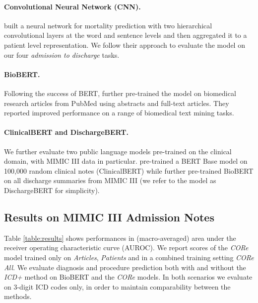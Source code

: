 \documentclass[11pt,a4paper]{article}
\begin{document}
\paragraph{Convolutional Neural Network (CNN).}
\citet{multitask-mortality} built a neural network for mortality prediction with two hierarchical convolutional layers at the word and sentence levels and then aggregated it to a patient level representation. We follow their approach to evaluate the model on our four \textit{admission to discharge} tasks.

\paragraph{BioBERT.}
Following the success of BERT, \citet{biobert} further pre-trained the model on biomedical research articles from PubMed using abstracts and full-text articles. They reported improved performance on a range of biomedical text mining tasks.

\paragraph{ClinicalBERT and DischargeBERT.} We further evaluate two public language models pre-trained on the clinical domain, with MIMIC III data in particular. \citet{huang-clinical-bert} pre-trained a BERT Base model on 100,000 random clinical notes (ClinicalBERT) while \citet{alsentzer-clinical-bert} further pre-trained BioBERT on all discharge summaries from MIMIC III (we refer to the model as DischargeBERT for simplicity).

\subsection{Results on MIMIC III Admission Notes}
\label{section:results}
Table \ref{table:results} shows performances in (macro-averaged) area under the receiver operating characteristic curve (AUROC). We report scores of the \textit{CORe} model trained only on \textit{Articles}, \textit{Patients} and in a combined training setting \textit{CORe All}. We evaluate diagnosis and procedure prediction both with and without the \textit{ICD+} method on BioBERT and the \textit{CORe} models. In both scenarios we evaluate on 3-digit ICD codes only, in order to maintain comparability between the methods.
\end{document}
